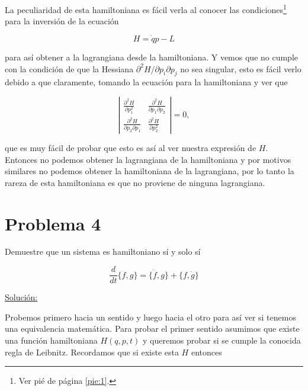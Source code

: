 \documentclass[a4paper,10pt]{article}
\numberwithin{equation}{section}
\begin{document}
\vspace{.3cm}

La peculiaridad de esta hamiltoniana es fácil verla al conocer las condiciones\footnote{Ver pié 
de página \ref{pie:1}.} para la inversión de la ecuación

\begin{equation}
 H = \dot{q}p - L
\end{equation}

para así obtener a la lagrangiana desde la hamiltoniana. Y vemos que no cumple con la 
condición de que la Hessiana $\partial^2 H/\partial p_i \partial p_j$ no sea singular, 
esto es fácil verlo debido a que claramente, tomando la ecuación para la hamiltoniana 
y ver que 

\begin{equation}
 \left|\begin{matrix}
  \frac{\partial^2 H}{\partial p_1^2} & \frac{\partial^2 H}{\partial p_1 \partial p_2} \\
  \frac{\partial^2 H}{\partial p_2 \partial p_1} & \frac{\partial^2 H}{\partial p_2^2}
 \end{matrix}\right| = 0,
\end{equation}

que es muy fácil de probar que esto es así al ver nuestra expresión de $H$. Entonces 
no podemos obtener la lagrangiana de la hamiltoniana y por motivos similares no podemos 
obtener la hamiltoniana de la lagrangiana, por lo tanto la rareza de esta hamiltoniana 
es que no proviene de ninguna lagrangiana.



\section{Problema 4}

Demuestre que un sistema es hamiltoniano sí y solo sí

$$
\frac{d}{dt}\{f,g\} = \{\dot{f},g\} + \{f,\dot{g}\}
$$

\vspace{.3cm}

\underline{Solución:} \vspace{.3cm}

Probemos primero hacia un sentido y luego hacia el otro para así ver si tenemos una equivalencia 
matemática. Para probar el primer sentido asumimos que existe una función hamiltoniana 
$H(q,p,t)$ y queremos probar si se cumple la conocida regla de Leibnitz. Recordamos 
que si existe esta $H$ entonces 
\end{document}
